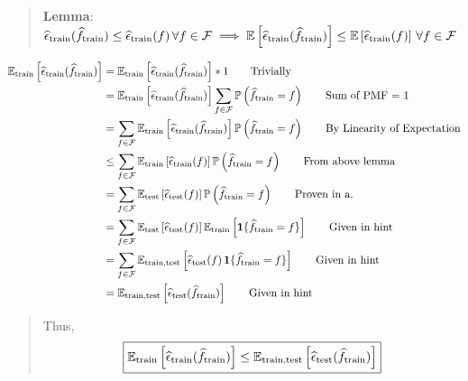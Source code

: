 \begin{quote}
    {\bf Lemma}: $\widehat{\epsilon}_{\textrm{train}} ( \widehat{f}_{\textrm{train}} ) \leq \widehat{\epsilon}_{\textrm{train}} (f) \, \forall f \in \mathcal{F} \implies \mathbb{E} \left[ \widehat{\epsilon}_{\textrm{train}} ( \widehat{f}_{\textrm{train}} ) \right] \leq \mathbb{E} \left[ \widehat{\epsilon}_{\textrm{train}} (f) \right] \, \forall f \in \mathcal{F}$
\end{quote}

\begin{align*}
    \mathbb{E}_{\textrm{train}} \left[ \widehat{\epsilon}_{\textrm{train}} ( \widehat{f}_{\textrm{train}} ) \right]
	&= \mathbb{E}_{\textrm{train}} \left[ \widehat{\epsilon}_{\textrm{train}} ( \widehat{f}_{\textrm{train}} ) \right] * 1 \tag*{Trivially} \\
	&= \mathbb{E}_{\textrm{train}} \left[ \widehat{\epsilon}_{\textrm{train}} ( \widehat{f}_{\textrm{train}} ) \right] \sum_{f \in \mathcal{F}} \mathbb{P} \left( \widehat{f}_{\textrm{train}} = f \right) \tag*{Sum of PMF = 1} \\
	&= \sum_{f \in \mathcal{F}} \mathbb{E}_{\textrm{train}} \left[ \widehat{\epsilon}_{\textrm{train}} ( \widehat{f}_{\textrm{train}} ) \right] \mathbb{P} \left( \widehat{f}_{\textrm{train}} = f \right) \tag*{By Linearity of Expectation} \\
	&\leq \sum_{f \in \mathcal{F}} \mathbb{E}_{\textrm{train}} \left[ \widehat{\epsilon}_{\textrm{train}} ( f ) \right] \mathbb{P} \left( \widehat{f}_{\textrm{train}} = f \right) \tag*{From above lemma} \\
	&= \sum_{f \in \mathcal{F}} \mathbb{E}_{\textrm{test}} \left[ \widehat{\epsilon}_{\textrm{test}} ( f ) \right] \mathbb{P} \left( \widehat{f}_{\textrm{train}} = f \right) \tag*{Proven in a.} \\
	&= \sum_{f \in \mathcal{F}} \mathbb{E}_{\textrm{test}} \left[ \widehat{\epsilon}_{\textrm{test}} ( f ) \right] \mathbb{E}_{\textrm{train}} \left[ \mathbf{1} \{ \widehat{f}_{\textrm{train}} = f \} \right] \tag*{Given in hint} \\
	&= \sum_{f \in \mathcal{F}} \mathbb{E}_{\textrm{train,test}} \left[ \widehat{\epsilon}_{\textrm{test}} ( f ) \,\mathbf{1} \{ \widehat{f}_{\textrm{train}} = f \} \right] \tag*{Given in hint} \\
	&= \mathbb{E}_{\textrm{train,test}} \left[ \widehat{\epsilon}_{\textrm{test}} ( \widehat{f}_{\textrm{train}} ) \right] \tag*{Given in hint}
\end{align*}

\begin{quote}
    Thus,$$\boxed{ \mathbb{E}_{\textrm{train}} \left[ \widehat{\epsilon}_{\textrm{train}} ( \widehat{f}_{\textrm{train}} ) \right] \leq \mathbb{E}_{\textrm{train,test}} \left[ \widehat{\epsilon}_{\textrm{test}} ( \widehat{f}_{\textrm{train}} ) \right] }$$
\end{quote}


